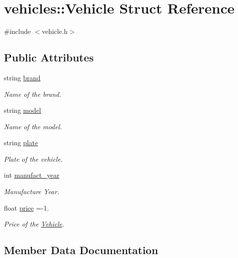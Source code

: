 \hypertarget{structvehicles_1_1_vehicle}{}\section{vehicles\+:\+:Vehicle Struct Reference}
\label{structvehicles_1_1_vehicle}


{\ttfamily \#include $<$vehicle.\+h$>$}

\subsection*{Public Attributes}
\begin{DoxyCompactItemize}
\item 
string \hyperlink{structvehicles_1_1_vehicle_a6e3dc68daf2c9e6388d6793544c32e2c}{brand}
\begin{DoxyCompactList}\small\item\em Name of the brand. \end{DoxyCompactList}\item 
string \hyperlink{structvehicles_1_1_vehicle_a124350d0a357f8c05c2e0e111e139fd1}{model}
\begin{DoxyCompactList}\small\item\em Name of the model. \end{DoxyCompactList}\item 
string \hyperlink{structvehicles_1_1_vehicle_a886f950c92dc093f683e477f6197ca17}{plate}
\begin{DoxyCompactList}\small\item\em Plate of the vehicle. \end{DoxyCompactList}\item 
int \hyperlink{structvehicles_1_1_vehicle_a5cfbdf38ce9efa53a671487320b019bb}{manufact\+\_\+year}
\begin{DoxyCompactList}\small\item\em Manufacture Year. \end{DoxyCompactList}\item 
float \hyperlink{structvehicles_1_1_vehicle_a11a85202c9d42f147ce5707768005156}{price} =-\/1.
\begin{DoxyCompactList}\small\item\em Price of the \hyperlink{structvehicles_1_1_vehicle}{Vehicle}. \end{DoxyCompactList}\end{DoxyCompactItemize}


\subsection{Member Data Documentation}
\mbox{\label{structvehicles_1_1_vehicle_a6e3dc68daf2c9e6388d6793544c32e2c}} 
